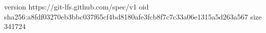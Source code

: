 version https://git-lfs.github.com/spec/v1
oid sha256:a8fdf03270eb3bbc037f65cf4bd8180afe3fcb8f7c7c33a06e1315a5d263a567
size 341724
